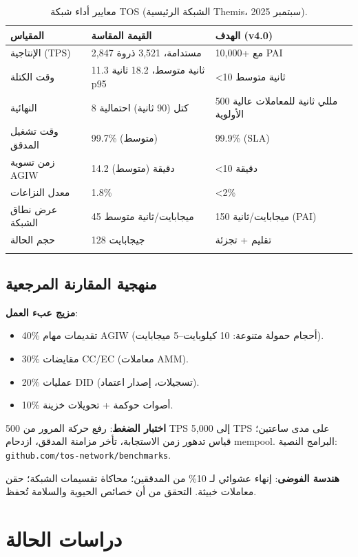 \documentclass[11pt]{article}
\begin{document}
\begin{longtable}{@{}p{}p{}p{}@{}}
\toprule
\textbf{المقياس} & \textbf{القيمة المقاسة} & \textbf{الهدف (v4.0)} \\\midrule
الإنتاجية (TPS) & 2,847 مستدامة، 3,521 ذروة & 10,000+ مع PAI \\
وقت الكتلة & 11.3 ثانية متوسط، 18.2 ثانية p95 & <10 ثانية متوسط \\
النهائية & 8 كتل (90 ثانية) احتمالية & 500 مللي ثانية للمعاملات عالية الأولوية \\
وقت تشغيل المدقق & 99.7\% (متوسط) & 99.9\% (SLA) \\
زمن تسوية AGIW & 14.2 دقيقة (متوسط) & <10 دقيقة \\
معدل النزاعات & 1.8\% & <2\% \\
عرض نطاق الشبكة & 45 ميجابايت/ثانية متوسط & 150 ميجابايت/ثانية (PAI) \\
حجم الحالة & 128 جيجابايت & تقليم + تجزئة \\
\bottomrule
\caption{معايير أداء شبكة TOS (الشبكة الرئيسية Themis، سبتمبر 2025).}
\end{longtable}

\subsection{منهجية المقارنة المرجعية}

\textbf{مزيج عبء العمل}:
\begin{itemize}[noitemsep]
  \item 40\% تقديمات مهام AGIW (أحجام حمولة متنوعة: 10 كيلوبايت--5 ميجابايت).
  \item 30\% مقايضات CC/EC (معاملات AMM).
  \item 20\% عمليات DID (تسجيلات، إصدار اعتماد).
  \item 10\% أصوات حوكمة + تحويلات خزينة.
\end{itemize}

\textbf{اختبار الضغط}: رفع حركة المرور من 500 TPS إلى 5,000 TPS على مدى ساعتين؛ قياس تدهور زمن الاستجابة، تأخر مزامنة المدقق، ازدحام mempool. البرامج النصية: \texttt{github.com/tos-network/benchmarks}.

\textbf{هندسة الفوضى}: إنهاء عشوائي لـ 10\% من المدققين؛ محاكاة تقسيمات الشبكة؛ حقن معاملات خبيثة. التحقق من أن خصائص الحيوية والسلامة تُحفظ.

\section{دراسات الحالة}
\label{sec:case-studies}
\end{document}
